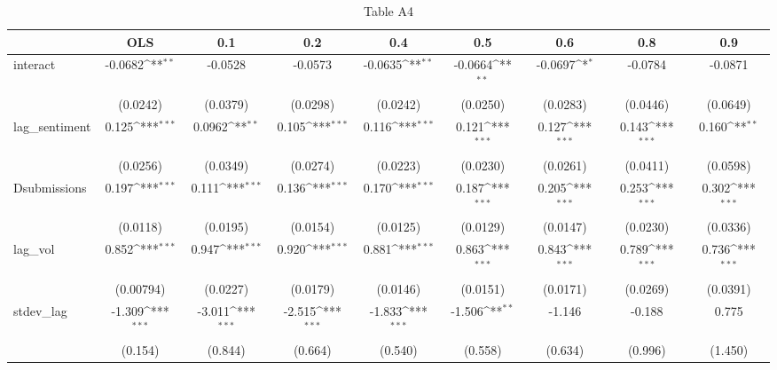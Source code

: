 \begin{table}[htbp]\centering
\def\sym#1{\ifmmode^{#1}\else\(^{#1}\)\fi}
\caption{Table A4}
\begin{tabular}{l*{8}{c}}
\hline\hline
                &\multicolumn{1}{c}{OLS}&\multicolumn{1}{c}{0.1}&\multicolumn{1}{c}{0.2}&\multicolumn{1}{c}{0.4}&\multicolumn{1}{c}{0.5}&\multicolumn{1}{c}{0.6}&\multicolumn{1}{c}{0.8}&\multicolumn{1}{c}{0.9}\\
\hline
interact        &  -0.0682\sym{**} &  -0.0528         &  -0.0573         &  -0.0635\sym{**} &  -0.0664\sym{**} &  -0.0697\sym{*}  &  -0.0784         &  -0.0871         \\
                & (0.0242)         & (0.0379)         & (0.0298)         & (0.0242)         & (0.0250)         & (0.0283)         & (0.0446)         & (0.0649)         \\
[1em]
lag\_sentiment   &    0.125\sym{***}&   0.0962\sym{**} &    0.105\sym{***}&    0.116\sym{***}&    0.121\sym{***}&    0.127\sym{***}&    0.143\sym{***}&    0.160\sym{**} \\
                & (0.0256)         & (0.0349)         & (0.0274)         & (0.0223)         & (0.0230)         & (0.0261)         & (0.0411)         & (0.0598)         \\
[1em]
Dsubmissions    &    0.197\sym{***}&    0.111\sym{***}&    0.136\sym{***}&    0.170\sym{***}&    0.187\sym{***}&    0.205\sym{***}&    0.253\sym{***}&    0.302\sym{***}\\
                & (0.0118)         & (0.0195)         & (0.0154)         & (0.0125)         & (0.0129)         & (0.0147)         & (0.0230)         & (0.0336)         \\
[1em]
lag\_vol         &    0.852\sym{***}&    0.947\sym{***}&    0.920\sym{***}&    0.881\sym{***}&    0.863\sym{***}&    0.843\sym{***}&    0.789\sym{***}&    0.736\sym{***}\\
                &(0.00794)         & (0.0227)         & (0.0179)         & (0.0146)         & (0.0151)         & (0.0171)         & (0.0269)         & (0.0391)         \\
[1em]
stdev\_lag       &   -1.309\sym{***}&   -3.011\sym{***}&   -2.515\sym{***}&   -1.833\sym{***}&   -1.506\sym{**} &   -1.146         &   -0.188         &    0.775         \\
                &  (0.154)         &  (0.844)         &  (0.664)         &  (0.540)         &  (0.558)         &  (0.634)         &  (0.996)         &  (1.450)         \\

\end{tabular}
\end{table}
